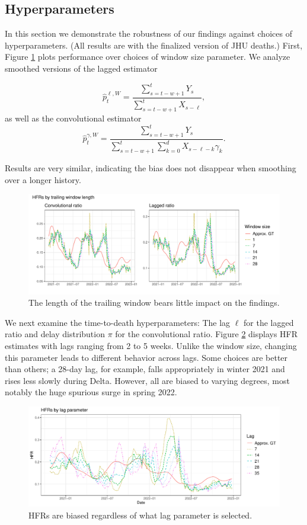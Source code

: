 \documentclass{article}
\renewcommand{\hat}{\widehat} %
\begin{document}
\subsection{Hyperparameters}
In this section we demonstrate the robustness of our findings against choices of hyperparameters. (All results are with the finalized version of JHU deaths.) First, Figure \ref{fig:window} plots performance over choices of window size parameter. We analyze smoothed versions of the lagged estimator

\begin{equation}\label{eq:laggedSmooth}
    \hat{p}_t^{\ell, W} = \frac{\sum_{s=t-w+1}^{t} Y_s}{\sum_{s=t-w+1}^{t} X_{s-\ell}},
\end{equation}
\noindent as well as the convolutional estimator
\begin{equation}\label{eq:convSmooth}
    \hat{p}_t^{\gamma, W} = \frac{\sum_{s=t-w+1}^{t} Y_s}{\sum_{s=t-w+1}^{t} \sum_{k=0}^d X_{s-\ell-k}\gamma_k}.
\end{equation}

\noindent Results are very similar, indicating the bias does not disappear when smoothing over a longer history. 

\begin{figure}
    \centering
    \includegraphics[width=0.75\linewidth]{Figures/Real/window_size.pdf}
    \caption{The length of the trailing window bears little impact on the findings.}
    \label{fig:window}
\end{figure}

We next examine the time-to-death hyperparameters: The lag $\ell$ for the lagged ratio and delay distribution $\pi$ for the convolutional ratio. Figure \ref{fig:lag} displays HFR estimates with lags ranging from 2 to 5 weeks. Unlike the window size, changing this parameter leads to different behavior across lags. Some choices are better than others; a 28-day lag, for example, falls appropriately in winter 2021 and rises less slowly during Delta. However, all are biased to varying degrees, most notably the huge spurious surge in spring 2022.

\begin{figure}
    \centering
    \includegraphics[width=0.7\linewidth]{Figures/Real/hfrs_by_lag.pdf}
    \caption{HFRs are biased regardless of what lag parameter is selected.}
    \label{fig:lag}
\end{figure}
\end{document}
